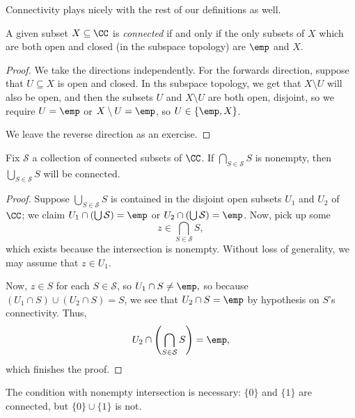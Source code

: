 Connectivity plays nicely with the rest of our definitions as well.
\begin{lemma}
	A given subset $X\subseteq\CC$ is \textit{connected} if and only if the only subsets of $X$ which are both open and closed (in the subspace topology) are $\emp$ and $X$.
\end{lemma}
\begin{proof}
	We take the directions independently. For the forwards direction, suppose that $U\subseteq X$ is open and closed. In ths subspace topology, we get that $X\setminus U$ will also be open, and then the subsets $U$ and $X\setminus U$ are both open, disjoint, so we require $U=\emp$ or $X\setminus U=\emp$, so $U\in\{\emp,X\}$.

	We leave the reverse direction as an exercise.\todo{}
\end{proof}
\begin{lemma}
	Fix $\mathcal S$ a collection of connected subsets of $\CC$. If $\bigcap_{S\in\mathcal S}S$ is nonempty, then $\bigcup_{S\in\mathcal S}S$ will be connected.
\end{lemma}
\begin{proof}
	Suppose $\bigcup_{S\in\mathcal S}S$ is contained in the disjoint open subsets $U_1$ and $U_2$ of $\CC$; we claim $U_1\cap(\bigcup\mathcal S)=\emp$ or $U_2\cap(\bigcup\mathcal S)=\emp$. Now, pick up some
	\[z\in\bigcap_{S\in\mathcal S}S,\]
	which exists because the intersection is nonempty. Without loss of generality, we may assume that $z\in U_1$.

	Now, $z\in S$ for each $S\in\mathcal S$, so $U_1\cap S\ne\emp,$ so because $(U_1\cap S)\cup(U_2\cap S)=S$, we see that $U_2\cap S=\emp$ by hypothesis on $S$'s connectivity. Thus,
	\[U_2\cap\left(\bigcap_{S\in\mathcal S}S\right)=\emp,\]
	which finishes the proof.
\end{proof}
\begin{remark}
	The condition with nonempty intersection is necessary: $\{0\}$ and $\{1\}$ are connected, but $\{0\}\cup\{1\}$ is not.
\end{remark}